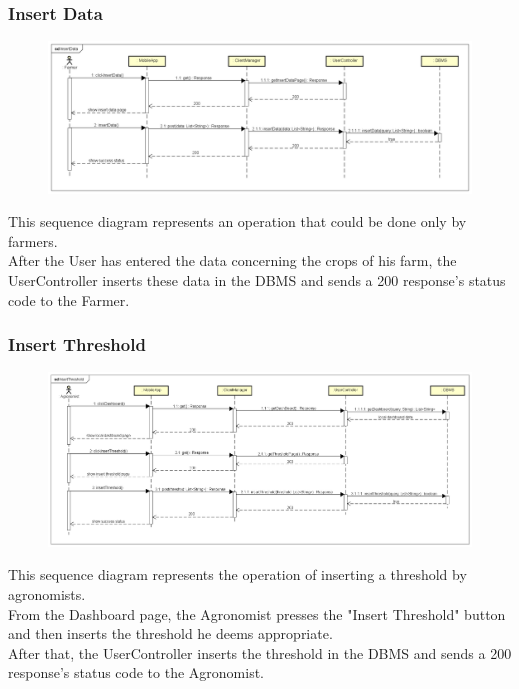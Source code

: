 \newpage
\subsubsection{Insert Data}

\begin{figure}[H]
    \begin{center}
        \includegraphics[width=\textwidth]{Images/SequenceDiagrams/InsertDataDD.png}
    \end{center}
\end{figure}

This sequence diagram represents an operation that could be done only by farmers.\\
After the User has entered the data concerning the crops of his farm, the UserController 
inserts these data in the DBMS and sends a 200 response's status code to the Farmer.


\bigskip
\subsubsection{Insert Threshold}

\begin{figure}[H]
    \begin{center}
        \includegraphics[width=\textwidth]{Images/SequenceDiagrams/InsertThresholdDD.png}
    \end{center}
\end{figure}

This sequence diagram represents the operation of inserting a threshold by agronomists.\\
From the Dashboard page, the Agronomist presses the "Insert Threshold" button and then inserts the threshold he deems appropriate.\\
After that, the UserController inserts the threshold in the DBMS and sends a 200 response's status code to the Agronomist.


